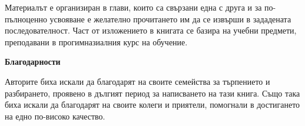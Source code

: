 Материалът е организиран в глави, които са свързани една с друга и за по-пълноценно усвояване е желателно прочитането им да се извърши в зададената последователност. Част от изложението в книгата се базира на учебни предмети, преподавани в прогимназиалния курс на обучение. 

\vspace{0.5cm}

\large{\textbf{Благодарности}}

\vspace{0.5cm}

Авторите биха искали да благодарят на своите семейства за търпението и разбирането, проявено в дългият период за написването на тази книга. Също така биха искали да благодарят на своите колеги и приятели, помогнали в достигането на едно по-високо качество. 

